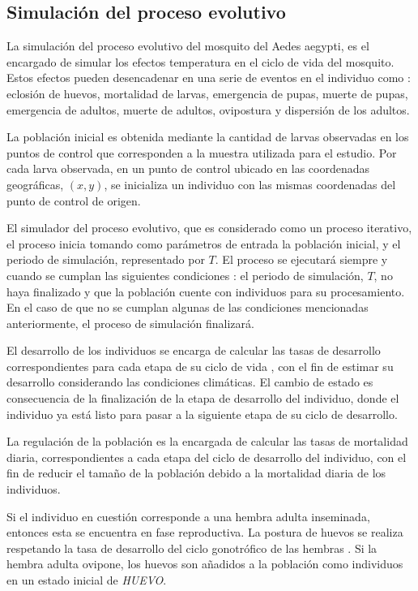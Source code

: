 \subsection{Simulación del proceso evolutivo}
La simulación del proceso evolutivo del mosquito del Aedes aegypti, es el encargado de simular los
efectos temperatura en el ciclo de vida del mosquito. Estos efectos pueden desencadenar en una
serie de eventos en el individuo como : eclosión de huevos, mortalidad de larvas, emergencia de
pupas, muerte de pupas, emergencia de adultos, muerte de adultos, ovipostura y dispersión de los
adultos.

La población inicial es obtenida mediante la cantidad de larvas observadas en los puntos de
control que corresponden a la muestra utilizada para el estudio. Por cada larva observada, en un
punto de control ubicado en las coordenadas geográficas, $(x, y)$, se inicializa un individuo con
las mismas coordenadas del punto de control de origen.

El simulador del proceso evolutivo, que es considerado como un proceso iterativo, el proceso
inicia tomando como parámetros de entrada la población inicial, y el periodo de simulación,
representado por $T$. El proceso se ejecutará siempre y cuando se cumplan las siguientes
condiciones : el periodo de simulación, $T$, no haya finalizado y que la población cuente con
individuos para su procesamiento. En el caso de que no se cumplan algunas de las condiciones
mencionadas anteriormente, el proceso de simulación finalizará.

El desarrollo de los individuos se encarga de calcular las tasas de desarrollo correspondientes
para cada etapa de su ciclo de vida , con el fin de estimar su desarrollo considerando las
condiciones climáticas. El cambio de estado es consecuencia de la finalización de la etapa de
desarrollo del individuo, donde el individuo ya está listo para pasar a la siguiente etapa de su
ciclo de desarrollo.

La regulación de la población es la encargada de calcular las tasas de mortalidad diaria,
correspondientes a cada etapa del ciclo de desarrollo del individuo, con el fin de reducir el
tamaño de la población debido a la mortalidad diaria de los individuos.

Si el individuo en cuestión corresponde a una hembra adulta inseminada, entonces esta se encuentra
en fase reproductiva. La postura de huevos se realiza respetando la tasa de desarrollo del ciclo
gonotrófico de las hembras . Si la hembra adulta ovipone, los huevos son añadidos a la población
como individuos en un estado inicial de \textit{HUEVO}.
